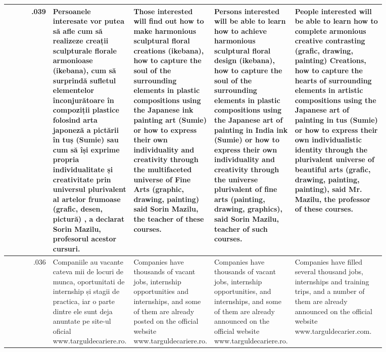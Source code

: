 \begin{table}[ht]
\begin{tabular}{r @{\hspace{1mm}} p{0.21\linewidth}p{0.21\linewidth}p{0.21\linewidth}p{0.24\linewidth}}
.039 & Persoanele interesate vor putea să afle cum să realizeze creații sculpturale florale armonioase (ikebana), cum să surprindă sufletul elementelor înconjurătoare în compoziții plastice folosind arta japoneză a pictării în tuș (Sumie) sau cum să își exprime propria individualitate și creativitate prin universul plurivalent al artelor frumoase (grafic, desen, pictură) , a declarat Sorin Mazilu, profesorul acestor cursuri. & Those interested will find out how to make harmonious sculptural floral creations (ikebana), how to capture the soul of the surrounding elements in plastic compositions using the Japanese ink painting art (Sumie) or how to express their own individuality and creativity through the multifaceted universe of Fine Arts (graphic, drawing, painting) said Sorin Mazilu, the teacher of these courses. & Persons interested will be able to learn how to achieve harmonious sculptural floral design (ikebana), how to capture the soul of the surrounding elements in plastic compositions using the Japanese art of painting in India ink (Sumie) or how to express their own individuality and creativity through the universe plurivalent of fine arts (painting, drawing, graphics), said Sorin Mazilu, teacher of such courses. & People interested will be able to learn how to complete armonious creative contrasting (grafic, drawing, painting) Creations, how to capture the hearts of surrounding elements in artistic compositions using the Japanese art of painting in tus (Sumie) or how to express their own individualistic identity through the plurivalent universe of beautiful arts (grafic, drawing, painting, painting), said Mr. Mazilu, the professor of these courses. \\\hline
.036 & Companiile au vacante cateva mii de locuri de munca, oportunitati de internship și stagii de practica, iar o parte dintre ele sunt deja anuntate pe site-ul oficial www.targuldecariere.ro. & Companies have thousands of vacant jobs, internship opportunities and internships, and some of them are already posted on the official website www.targuldecariere.ro. & Companies have thousands of vacant jobs, internship opportunities, and internships, and some of them are already announced on the official website www.targuldecariere.ro. & Companies have filled several thousand jobs, internships and training trips, and a number of them are already announced on the official website www.targuldecarier.com. \\\hline

\end{tabular}
\end{table}
